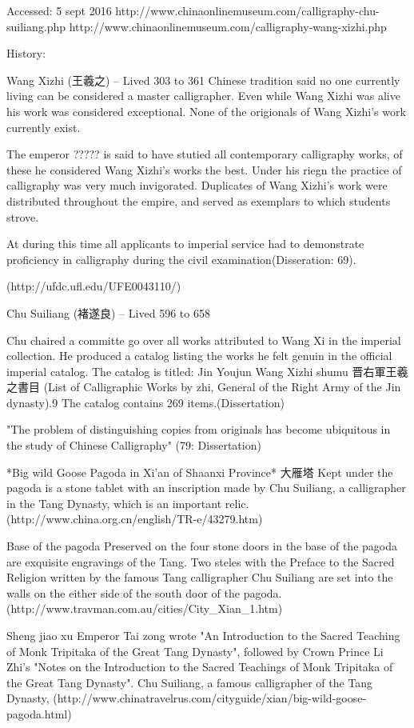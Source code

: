 Accessed:  5 sept 2016
http://www.chinaonlinemuseum.com/calligraphy-chu-suiliang.php 
http://www.chinaonlinemuseum.com/calligraphy-wang-xizhi.php

History:

Wang Xizhi (王羲之) -- Lived 303 to 361
Chinese tradition said no one currently living can be considered a master calligrapher.  Even while Wang Xizhi was alive his work was considered exceptional.  None of the origionals of Wang Xizhi's work currently exist.

The emperor ????? is said to have stutied all contemporary calligraphy works, of these he considered Wang Xizhi's works the best.  Under his riegn the practice of calligraphy was very much invigorated.  Duplicates of Wang Xizhi's work were distributed throughout the empire, and served as exemplars to which students strove.

At during this time all applicants to imperial service had to demonstrate proficiency in calligraphy during the civil examination(Disseration: 69).

(http://ufdc.ufl.edu/UFE0043110/)

Chu Suiliang (褚遂良) -- Lived 596 to 658


Chu chaired a committe go over all works attributed to Wang Xi in the imperial collection.  He produced a catalog listing the works he felt genuin in the official imperial catalog.  The catalog is titled: 
Jin Youjun Wang Xizhi shumu 晋右軍王羲之書目 (List of Calligraphic Works by zhi, General of the Right Army of the Jin dynasty).9 The catalog contains 269 items.(Dissertation)

"The problem of distinguishing copies from originals has become ubiquitous in the study of Chinese Calligraphy" (79: Dissertation)


*Big wild Goose Pagoda in Xi'an of Shaanxi Province* 大雁塔
Kept under the pagoda is a stone tablet with an inscription made by Chu Suiliang, a calligrapher in the Tang Dynasty, which is an important relic. (http://www.china.org.cn/english/TR-e/43279.htm)

Base of the pagoda
Preserved on the four stone doors in the base of the pagoda are exquisite engravings of the Tang. Two steles with the Preface to the Sacred Religion written by the famous Tang calligrapher Chu Suiliang are set into the walls on the either side of the south door of the pagoda. (http://www.travman.com.au/cities/City_Xian_1.htm)

Sheng jiao xu
 Emperor Tai zong wrote "An Introduction to the Sacred Teaching of Monk Tripitaka of the Great Tang Dynasty", followed by Crown Prince Li Zhi's "Notes on the Introduction to the Sacred Teachings of Monk Tripitaka of the Great Tang Dynasty". Chu Suiliang, a famous calligrapher of the Tang Dynasty, (http://www.chinatravelrus.com/cityguide/xian/big-wild-goose-pagoda.html)

